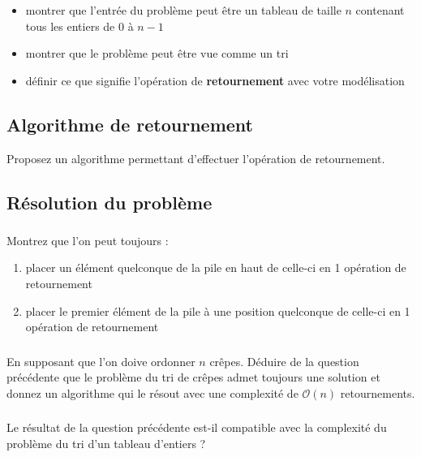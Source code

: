 \documentclass
[12pt]
{article}
\begin{document}
\begin{itemize}
    \item montrer que l'entrée du problème peut être un tableau de taille $n$ contenant tous les entiers de $0$ à $n-1$
    \item montrer que le problème peut être vue comme un tri
    \item définir ce que signifie l'opération de {\bf retournement} avec votre modélisation
\end{itemize}

\subsection{Algorithme de retournement}

Proposez un algorithme permettant d'effectuer l'opération de retournement.

\subsection{Résolution du problème}

\subsubsection{}
Montrez que l'on peut toujours :

\begin{enumerate}
    \item placer un élément quelconque de la pile en haut de celle-ci en 1 opération de retournement
    \item placer le premier élément de la pile à une position quelconque de celle-ci en 1 opération de retournement
\end{enumerate}

\subsubsection{}

En supposant que l'on doive ordonner $n$ crêpes. Déduire de la question précédente que le problème du tri de crêpes admet toujours une solution et donnez un algorithme qui le résout avec une complexité de $\mathcal{O}(n)$ retournements.

\subsubsection{}

Le résultat de la question précédente est-il compatible avec la complexité du problème du tri d'un tableau d'entiers ?
\end{document}
